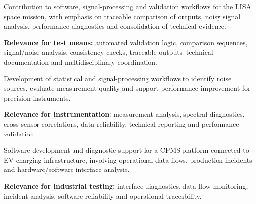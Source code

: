 \documentclass[8pt,a4paper,ragged2e,withhyper]{altacv}
\begin{document}


Contribution to software, signal-processing and validation workflows for the LISA space mission, with emphasis on traceable comparison of outputs, noisy signal analysis, performance diagnostics and consolidation of technical evidence.

\textbf{Relevance for test means:} automated validation logic, comparison sequences, signal/noise analysis, consistency checks, traceable outputs, technical documentation and multidisciplinary coordination.

\divider


Development of statistical and signal-processing workflows to identify noise sources, evaluate measurement quality and support performance improvement for precision instruments.

\textbf{Relevance for instrumentation:} measurement analysis, spectral diagnostics, cross-sensor correlations, data reliability, technical reporting and performance validation.

\divider


Software development and diagnostic support for a CPMS platform connected to EV charging infrastructure, involving operational data flows, production incidents and hardware/software interface analysis.

\textbf{Relevance for industrial testing:} interface diagnostics, data-flow monitoring, incident analysis, software reliability and operational traceability.
\end{document}
